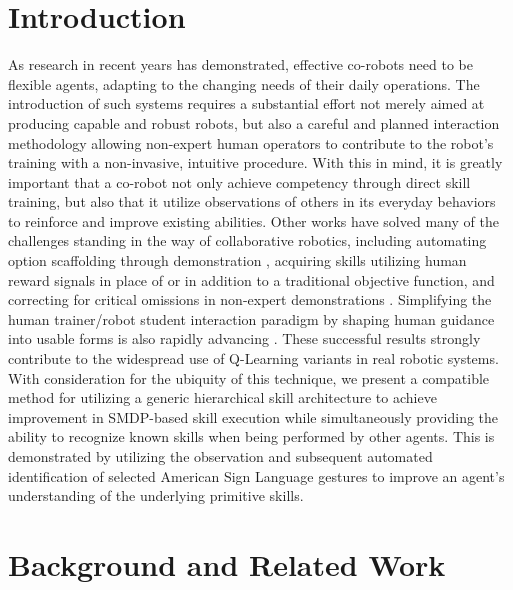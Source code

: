 \documentclass[letterpaper]{article}
\begin{document}
\section{Introduction}
\label{sec:intro}
As research in recent years has demonstrated, effective co-robots need to be flexible agents, adapting to the changing needs of their daily operations. The introduction of such systems requires a substantial effort not merely aimed at producing capable and robust robots, but also a careful and planned interaction methodology allowing non-expert human operators to contribute to the robot's training with a non-invasive, intuitive procedure. With this in mind, it is greatly important that a co-robot not only achieve competency through direct skill training, but also that it utilize observations of others in its everyday behaviors to reinforce and improve existing abilities. Other works have solved many of the challenges standing in the way of collaborative robotics, including automating option scaffolding through demonstration \cite{AutoSkillAcquisition}, acquiring skills utilizing human reward signals in place of \cite{TAMER} or in addition to \cite{TeacherRL} a traditional objective function, and correcting for critical omissions in non-expert demonstrations \cite{PerspectiveTaking}. Simplifying the human trainer/robot student interaction paradigm by shaping human guidance into usable forms is also rapidly advancing \cite{TAMER,Clicker,AdviceTaking,TeacherRL,DemonstrationRL}. These successful results strongly contribute to the widespread use of Q-Learning variants in real robotic systems. With consideration for the ubiquity of this technique, we present a compatible method for utilizing a generic hierarchical skill architecture to achieve improvement in SMDP-based skill execution while simultaneously providing the ability to recognize known skills when being performed by other agents. This is demonstrated by utilizing the observation and subsequent automated identification of selected American Sign Language gestures to improve an agent's understanding of the underlying primitive skills.

\section{Background and Related Work}
\label{sec:background}
\end{document}
